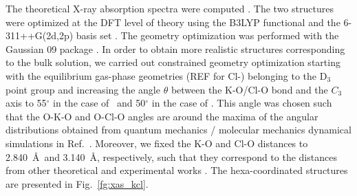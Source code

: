 The theoretical X-ray absorption spectra were computed . The two structures were optimized at the DFT level of theory using the B3LYP functional and the 6-311++G(2d,2p) basis set \citep{Krishnan80:650,Blaudeau97:5016}. The geometry optimization was performed with the Gaussian 09 package \citep{g09}. In order to obtain more realistic structures corresponding to the bulk solution, we carried out constrained geometry optimization starting with the equilibrium gas-phase geometries \citep{lee99:3995}(REF for Cl-) belonging to the D$_3$ point group and increasing the angle $\theta$ between the K-O/Cl-O bond and the $C_3$ axis to 55$^{\circ}$ in the case of \ki~and 50$^{\circ}$ in the case of \cli. This angle was chosen such that the O-K-O and O-Cl-O angles are around the maxima of the angular distributions obtained from quantum mechanics / molecular mechanics dynamical simulations in Ref.\ \citep{ma14:1006}. Moreover, we fixed the K-O and Cl-O distances to 2.840~\AA~and 3.140~\AA, respectively, such that they correspond to the distances from other theoretical and experimental works \citep{ge13:13169,gora00:7,Ohtaki93:1157,soper06:180,ma14:1006}. The hexa-coordinated structures are presented in Fig.\ \ref{fg:xas_kcl}. %


